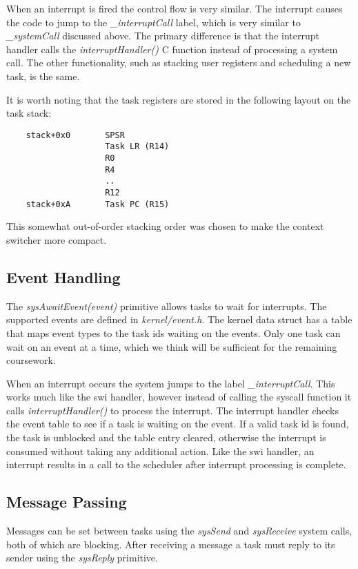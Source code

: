 \documentclass[twoside,a4paper]{refart}
\begin{document}
When an interrupt is fired the control flow is very similar. The interrupt causes the code to jump to the \textit{\_interruptCall} label, which is very similar to \textit{\_systemCall} discussed above. The primary difference is that the interrupt handler calls the  \textit{interruptHandler()} C function instead of processing a system call. The other functionality, such as stacking user registers and scheduling a new task, is the same.

It is worth noting that the task registers are stored in the following layout on the task stack:

\begin{verbatim}
    stack+0x0       SPSR
                    Task LR (R14)
                    R0
                    R4
                    ..
                    R12
    stack+0xA       Task PC (R15)
\end{verbatim}
This somewhat out-of-order stacking order was chosen to make the context switcher more compact.

\subsection{Event Handling}
The \textit{sysAwaitEvent(event)} primitive allows tasks to wait for interrupts. The supported events are defined in \textit{kernel/event.h}. The kernel data struct has a table that maps event types to the task ids waiting on the events. Only one task can wait on an event at a time, which we think will be sufficient for the remaining coursework.

When an interrupt occurs the system jumps to the label \textit{\_interruptCall}. This works much like the swi handler, however instead of calling the syscall function it calls \textit{interruptHandler()} to process the interrupt. The interrupt handler checks the event table to see if a task is waiting on the event. If a valid task id is found, the task is unblocked and the table entry cleared, otherwise the interrupt is consumed without taking any additional action. Like the swi handler, an interrupt results in a call to the scheduler after interrupt processing is complete.

\subsection{Message Passing}
Messages can be set between tasks using the \textit{sysSend} and \textit{sysReceive} system calls, both of which are blocking. After receiving a message a task must reply to its sender using the \textit{sysReply} primitive.
\end{document}
